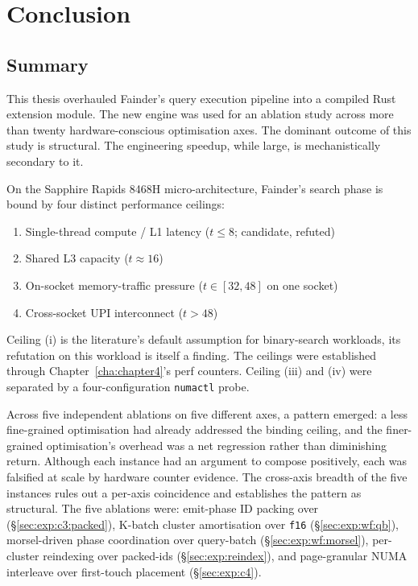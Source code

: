 \chapter{Conclusion\label{cha:chapter6}}

\section{Summary}

This thesis overhauled Fainder's query execution pipeline into a compiled Rust extension module. The new engine was used for an ablation study across more than twenty hardware-conscious optimisation axes. The dominant outcome of this study is structural. The engineering speedup, while large, is mechanistically secondary to it.

On the Sapphire Rapids 8468H micro-architecture, Fainder's search phase is bound by four distinct performance ceilings: 

\begin{enumerate}
    \item Single-thread compute / L1 latency (\(t\leq 8\); candidate, refuted)
    \item Shared L3 capacity (\(t\approx 16\))
    \item On-socket memory-traffic pressure (\(t\in[32, 48]\) on one socket)
    \item Cross-socket UPI interconnect (\(t > 48\))
\end{enumerate}

Ceiling (i) is the literature's default assumption for binary-search workloads, its refutation on this workload is itself a finding. The ceilings were established through Chapter~\ref{cha:chapter4}'s perf counters. Ceiling (iii) and (iv) were separated by a four-configuration \texttt{numactl} probe.

Across five independent ablations on five different axes, a pattern emerged: a less fine-grained optimisation had already addressed the binding ceiling, and the finer-grained optimisation's overhead was a net regression rather than diminishing return. Although each instance had an argument to compose positively, each was falsified at scale by hardware counter evidence. The cross-axis breadth of the five instances rules out a per-axis coincidence and establishes the pattern as structural. The five ablations were: emit-phase ID packing over \bcombo{} (§\ref{sec:exp:c3:packed}), K-batch cluster amortisation over \texttt{f16} (§\ref{sec:exp:wf:qb}), morsel-driven phase coordination over query-batch (§\ref{sec:exp:wf:morsel}), per-cluster reindexing over packed-ids (§\ref{sec:exp:reindex}), and page-granular NUMA interleave over first-touch placement (§\ref{sec:exp:c4}). 

